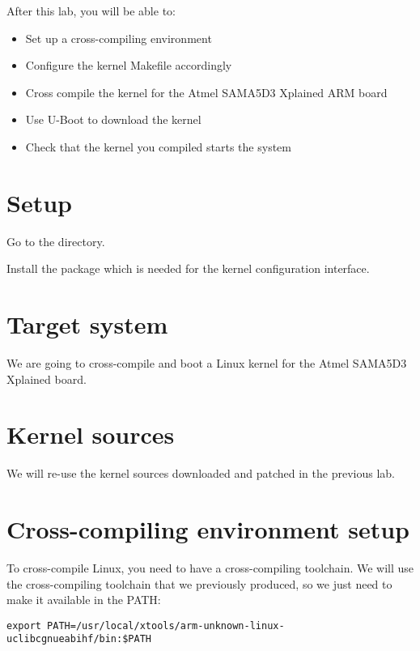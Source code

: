 
After this lab, you will be able to:
\begin{itemize}
\item Set up a cross-compiling environment
\item Configure the kernel Makefile accordingly
\item Cross compile the kernel for the Atmel SAMA5D3 Xplained ARM board
\item Use U-Boot to download the kernel
\item Check that the kernel you compiled starts the system
\end{itemize}

\section{Setup}

Go to the  directory.

Install the package  which is needed for the
 kernel configuration interface.

\section{Target system}

We are going to cross-compile and boot a Linux kernel for the Atmel
SAMA5D3 Xplained board.

\section{Kernel sources}

We will re-use the kernel sources downloaded and patched in the
previous lab.

\section{Cross-compiling environment setup}

To cross-compile Linux, you need to have a cross-compiling
toolchain. We will use the cross-compiling toolchain that we
previously produced, so we just need to make it available in the PATH:

\begin{verbatim}
export PATH=/usr/local/xtools/arm-unknown-linux-uclibcgnueabihf/bin:$PATH
\end{verbatim}


